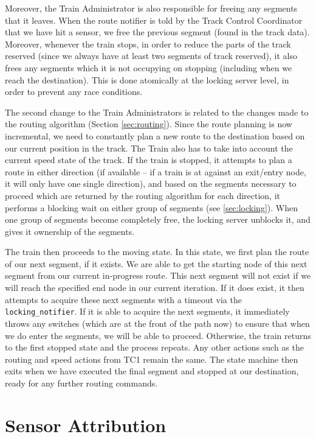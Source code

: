 \documentclass[12pt, titlepage]{article}
\begin{document}
    Moreover, the Train Administrator is also responsible for freeing any segments that it leaves. When the route notifier is told by the Track Control Coordinator that we have hit a sensor, we free the previous segment (found in the track data). Moreover, whenever the train stops, in order to reduce the parts of the track reserved (since we always have at least two segments of track reserved), it also frees any segments which it is not occupying on stopping (including when we reach the destination). This is done atomically at the locking server level, in order to prevent any race conditions.
    
    The second change to the Train Administrators is related to the changes made to the routing algorithm (Section \ref{sec:routing}). Since the route planning is now incremental, we need to constantly plan a new route to the destination based on our current position in the track. The Train also has to take into account the current speed state of the track. If the train is stopped, it attempts to plan a route in either direction (if available -- if a train is at against an exit/entry node, it will only have one single direction), and based on the segments necessary to proceed which are returned by the routing algorithm for each direction, it performs a blocking wait on either group of segments (see \ref{sec:locking}). When one group of segments become completely free, the locking server unblocks it, and gives it ownership of the segments. 
    
    The train then proceeds to the moving state. In this state, we first plan the route of our next segment, if it exists. We are able to get the starting node of this next segment from our current in-progress route. This next segment will not exist if we will reach the specified end node in our current iteration. If it does exist, it then attempts to acquire these next segments with a timeout via the \verb`locking_notifier`. If it is able to acquire the next segments, it immediately throws any switches (which are at the front of the path now) to ensure that when we do enter the segments, we will be able to proceed. Otherwise, the train returns to the first stopped state and the process repeats. Any other actions such as the routing and speed actions from TC1 remain the same. The state machine then exits when we have executed the final segment and stopped at our destination, ready for any further routing commands.


    \section{Sensor Attribution}
    \label{sec:sensor-attribution}
    
\end{document}
